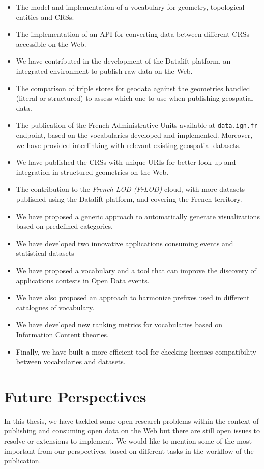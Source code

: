 \begin{itemize}
\item The model and implementation of a vocabulary for geometry, topological entities and CRSs.
\item The implementation of an API for converting data between different CRSs accessible on the Web.
\item We have contributed in the development of the Datalift platform, an integrated environment to publish raw data on the Web.
\item The comparison of triple stores for geodata against the geometries handled (literal or structured) to assess which one to use when publishing geospatial data. 
\item The publication of the French Administrative Units available at \texttt{data.ign.fr} endpoint, based on the vocabularies developed and implemented. Moreover, we have provided interlinking with relevant existing geospatial datasets.
\item We have published the CRSs with unique URIs for better look up and integration in structured geometries on the Web.
\item The contribution to the \textit{French LOD (FrLOD)} cloud, with more datasets published using the Datalift platform, and covering the French territory.
\item We have proposed a generic approach to automatically generate visualizations based on predefined categories.
\item We have developed two innovative applications consuming events and statistical datasets
\item We have proposed a vocabulary and a tool that can improve the discovery of applications contests in Open Data events.
\item We have also proposed an approach to harmonize prefixes used in different catalogues of vocabulary.
\item We have developed new ranking metrics for vocabularies based on Information Content theories.
\item Finally, we have built a more efficient tool for checking licenses compatibility between vocabularies and datasets.
\end{itemize}


\section{Future Perspectives}
\label{sec:future}

In this thesis, we have tackled some open research problems within the context of publishing and consuming open data on the Web but there are still open issues to resolve or extensions to implement. We would like to mention some of the most important from our perspectives, based on different tasks in the workflow of the publication. 

